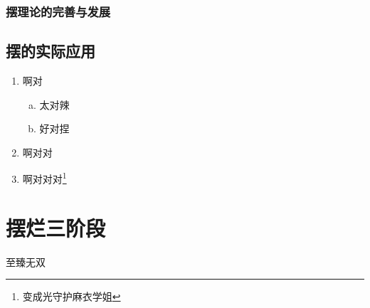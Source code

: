 \documentclass[12pt,a4paper]{article}%
\begin{document}
        \subsubsection{摆理论的完善与发展}
    \subsection{摆的实际应用}
        \begin{enumerate}[1.]%
            \item 啊对
            \begin{enumerate}[(a)]%
            \item 太对辣
            \item 好对捏
            \end{enumerate}
            \item 啊对对
            \item 啊对对对\footnote{变成光守护麻衣学姐}%
        \end{enumerate}
    
    \section{摆烂三阶段}
    至臻无双




    
\end{document}
